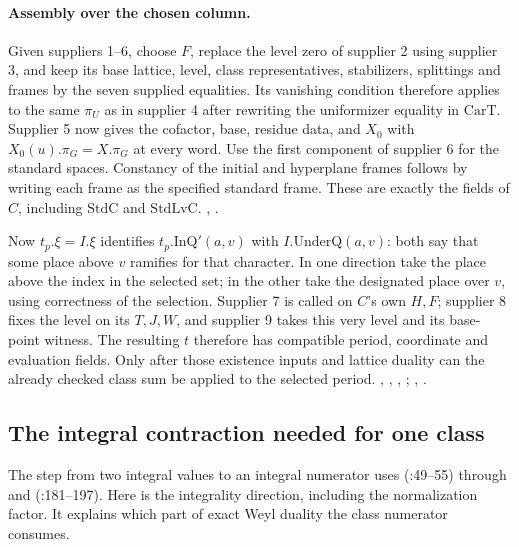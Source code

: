 \paragraph{Assembly over the chosen column.}
Given suppliers 1--6, choose $F$, replace the level zero of supplier 2
using supplier 3, and keep its base lattice, level, class representatives,
stabilizers, splittings and frames by the seven supplied equalities.
Its vanishing condition therefore applies to the same $\pi_U$ as in
supplier 4 after rewriting the uniformizer equality in $\mathrm{CarT}$.
Supplier 5 now gives the cofactor, base, residue data, and $X_0$ with
$X_0(u).\pi_G=X.\pi_G$ at every word. Use the first component of
supplier 6 for the standard spaces. Constancy of the initial and
hyperplane frames follows by writing each frame as the specified
standard frame. These are exactly the fields of $C$, including
$\mathrm{StdC}$ and $\mathrm{StdLvC}$.
, .

Now $t_p.\xi=I.\xi$ identifies $t_p.\mathrm{InQ}'(a,v)$ with
$I.\mathrm{UnderQ}(a,v)$: both say that some place above $v$ ramifies for
that character. In one direction take the place above the index in
the selected set; in the other take the designated place over $v$,
using correctness of the selection. Supplier 7 is called on $C$'s
own $H,F$; supplier 8 fixes the level on its $T,J,W$, and supplier 9
takes this very level and its base-point witness. The resulting $t$
therefore has compatible period, coordinate and evaluation fields.
Only after those existence inputs and lattice duality can the already
checked class sum be applied to the selected period.
, , ,
;
,
.

\subsection{The integral contraction needed for one class}\label{r11:fock}
The step from two integral values to an integral numerator uses
 (:49--55) through
 and 
(:181--197).
Here is the integrality direction, including the normalization factor.
It explains which part of exact Weyl duality the class numerator consumes.


